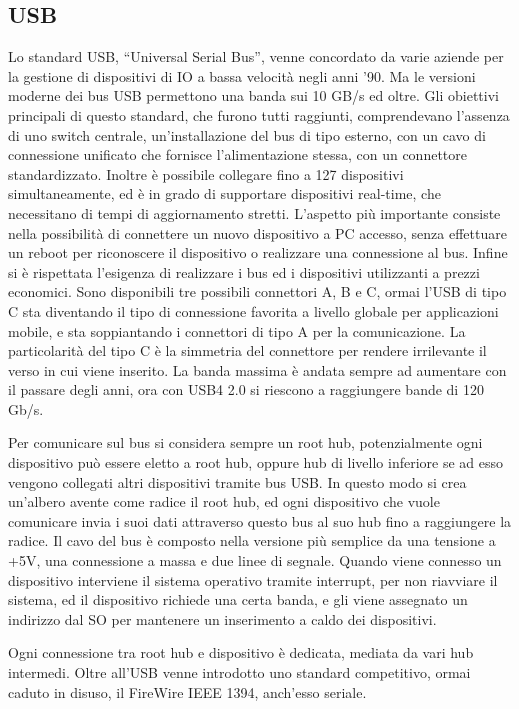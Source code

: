 \documentclass{article}
\numberwithin{equation}{subsection}
\begin{document}
\subsection{USB}

Lo standard USB, ``Universal Serial Bus'', venne concordato da varie aziende per la gestione di dispositivi di IO a bassa velocità negli anni '90. Ma le versioni moderne dei bus USB permettono 
una banda sui 10 GB/s ed oltre. Gli obiettivi principali di questo standard, che furono tutti raggiunti, comprendevano l'assenza di uno switch centrale, un'installazione del bus di tipo 
esterno, con un cavo di connessione unificato che fornisce l'alimentazione stessa, con un connettore standardizzato. Inoltre è possibile collegare fino a 127 dispositivi simultaneamente, ed 
è in grado di supportare dispositivi real-time, che necessitano di tempi di aggiornamento stretti. L'aspetto più importante consiste nella possibilità di connettere un nuovo dispositivo a PC 
accesso, senza effettuare un reboot per riconoscere il dispositivo o realizzare una connessione al bus. 
Infine si è rispettata l'esigenza di realizzare i bus ed i dispositivi utilizzanti a prezzi economici. 
Sono disponibili tre possibili connettori A, B e C, ormai l'USB di tipo C sta diventando il tipo di connessione favorita a livello globale per applicazioni mobile, e sta soppiantando 
i connettori di tipo A per la comunicazione. La particolarità del tipo C è la simmetria del connettore per rendere irrilevante il verso in cui viene inserito. La banda massima è andata 
sempre ad aumentare con il passare degli anni, ora con USB4 2.0 si riescono a raggiungere bande di 120 Gb/s. 

Per comunicare sul bus si considera sempre un root hub, potenzialmente ogni dispositivo può essere eletto a root hub, oppure hub di livello inferiore se ad esso vengono collegati 
altri dispositivi tramite bus USB. In questo modo si crea un'albero avente come radice il root hub, ed ogni dispositivo che vuole comunicare invia i suoi dati attraverso questo bus al 
suo hub fino a raggiungere la radice. Il cavo del bus è composto nella versione più semplice da una tensione a +5V, una connessione a massa e due linee di segnale. 
Quando viene connesso un dispositivo interviene il sistema operativo tramite interrupt, per non riavviare il sistema, ed il dispositivo richiede una certa banda, e gli viene assegnato un 
indirizzo dal SO per mantenere un inserimento a caldo dei dispositivi. 

Ogni connessione tra root hub e dispositivo è dedicata, mediata da vari hub intermedi. Oltre all'USB venne introdotto uno standard competitivo, ormai caduto in disuso, il FireWire IEEE 1394, 
anch'esso seriale. 
\end{document}

